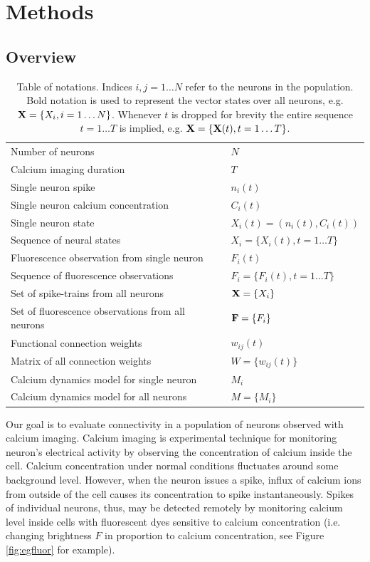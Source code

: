 \documentclass[amsmath,amssymb]{revtex4}
\begin{document}
\section{\label{sec:methods}Methods}
\subsection{\label{sec:methods:introduction}Overview}
\begin{table}[h!b!p!]
\begin{tabular}{ll}
Number of neurons         & $N$ \\
Calcium imaging duration & $T$ \\
Single neuron spike & $n_i(t)$ \\
Single neuron calcium concentration & $C_i(t)$ \\
Single neuron state & $X_i(t)=(n_i(t),C_i(t))$ \\
Sequence of neural states & $X_i=\{X_i(t),t=1\ldots T\}$ \\
Fluorescence observation from single neuron & $F_i(t)$ \\
Sequence of fluorescence observations & $F_i=\{F_i(t),t=1\ldots T\}$ \\
Set of spike-trains from all neurons   & ${\bf X}=\{X_i\}$ \\
Set of fluorescence observations from all neurons & ${\bf F}=\{F_i\}$ \\
Functional connection weights & $w_{ij}(t)$ \\
Matrix of all connection weights & $W=\{w_{ij}(t)\}$ \\
Calcium dynamics model for single neuron & $M_i$ \\
Calcium dynamics model for all neurons & $M=\{M_i\}$
\end{tabular}
\caption{Table of notations. Indices $i,j=1\ldots N$ refer to the neurons in the population. Bold notation is used to represent the vector states over all neurons, e.g. ${\bf X}=\{X_i,i=1\ldots N\}$. Whenever $t$ is dropped for brevity the entire sequence $t=1\ldots T$ is implied, e.g. ${\bf X}=\{{\bf X}(t),t=1\ldots T\}$.}
\label{table:notation}
\end{table}
Our goal is to evaluate connectivity in a population of neurons observed with calcium imaging.
Calcium imaging is experimental technique for monitoring neuron's electrical activity  by observing the concentration of calcium inside the cell. 
Calcium concentration under normal conditions fluctuates around some background level. 
However, when the neuron issues a spike, influx of calcium ions from outside of the cell causes its concentration to spike instantaneously. 
Spikes of individual neurons, thus, may be detected remotely by monitoring calcium level inside cells with fluorescent dyes sensitive to calcium concentration (i.e. changing brightness $F$ in proportion to calcium concentration, see Figure \ref{fig:egfluor} for example).
\end{document}
